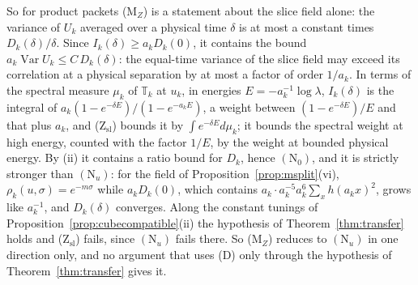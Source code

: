 \documentclass[aps,prd,twocolumn,superscriptaddress,nofootinbib,longbibliography,floatfix,amsmath,amssymb,10pt]{revtex4-2}
\theoremstyle{definition}
\theoremstyle{remark}
\newcommand{\Var}{\operatorname{Var}}
\begin{document}
So for product packets (M$_Z$) is a statement about the slice field alone:
the variance of $U_k$ averaged over a physical time $\delta$ is at most a
constant times $D_k(\delta)/\delta$. Since $I_k(\delta)\ge a_kD_k(0)$, it
contains the bound $a_k\Var U_k\le C\,D_k(\delta)$: the equal-time variance
of the slice field may exceed its correlation at a physical separation by
at most a factor of order $1/a_k$. In terms of the spectral measure
$\mu_k$ of $\mathbb T_k$ at $u_k$, in energies $E=-a_k^{-1}\log\lambda$,
$I_k(\delta)$ is the integral of $a_k(1-e^{-\delta E})/(1-e^{-a_kE})$, a
weight between $(1-e^{-\delta E})/E$ and that plus $a_k$, and
(Z$_{\mathrm{sl}}$) bounds it by $\int e^{-\delta E}d\mu_k$; it bounds the
spectral weight at high energy, counted with the factor $1/E$, by the
weight at bounded physical energy. By (ii) it contains a ratio bound for
$D_k$, hence $(\mathrm N_0)$, and it is strictly stronger than
$(\mathrm N_u)$: for the field of Proposition~\ref{prop:msplit}(vi),
$\rho_k(u,\sigma)=e^{-m\sigma}$ while $a_kD_k(0)$, which contains
$a_k\cdot a_k^{-5}a_k^6\sum_xh(a_kx)^2$, grows like $a_k^{-1}$, and
$D_k(\delta)$ converges. Along the constant tunings of
Proposition~\ref{prop:cubecompatible}(ii) the hypothesis of
Theorem~\ref{thm:transfer} holds and (Z$_{\mathrm{sl}}$) fails, since
$(\mathrm N_u)$ fails there. So (M$_Z$) reduces to $(\mathrm N_u)$ in one
direction only, and no argument that uses (D) only through the hypothesis of
Theorem~\ref{thm:transfer} gives it.
\end{document}
